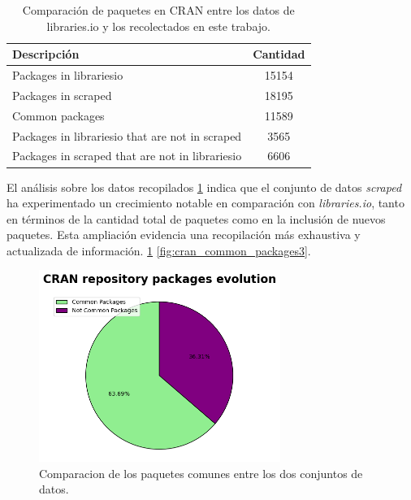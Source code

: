 \begin{table}[h!]
    \begin{center}
        \begin{tabular}{|l|c|}
            \hline
            \textbf{Descripción}                            & \textbf{Cantidad} \\
            \hline
            Packages in librariesio                         & 15154             \\
            Packages in scraped                             & 18195             \\
            Common packages                                 & 11589             \\
            Packages in librariesio that are not in scraped & 3565              \\
            Packages in scraped that are not in librariesio & 6606              \\
            \hline
        \end{tabular}
        \caption{Comparación de paquetes en CRAN entre los datos de libraries.io y los recolectados en este trabajo.}
        \label{tab:cran_common_packages}
    \end{center}
\end{table}

El análisis sobre los datos recopilados \ref{tab:cran_common_packages} indica que el conjunto de datos \textit{scraped}
ha experimentado un crecimiento notable en comparación con \textit{libraries.io}, tanto en
términos de la cantidad total de paquetes como en la inclusión de nuevos paquetes.
Esta ampliación evidencia una recopilación más exhaustiva y actualizada de información. \ref{fig:cran_common_packages2}
\ref{fig:cran_common_packages3}.

\begin{figure}[h!]
    \begin{center}
        \includegraphics[width=0.7\textwidth]{img/cran/circle.png}
        \caption{Comparacion de los paquetes comunes entre los dos conjuntos de datos.}
        \label{fig:cran_common_packages2}
    \end{center}
\end{figure}

